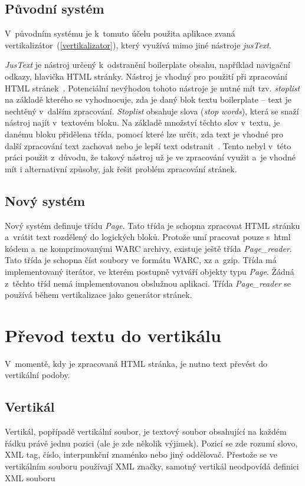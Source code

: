 \section{Původní systém}
V~původním systému je k~tomuto účelu použita aplikace zvaná vertikalizátor~(\ref{vertikalizator}), který využívá
mimo jiné nástroje \textit{jusText}.

\label{jusText}
\textit{JusText} je nástroj určený k~odstranění boilerplate obsahu, například navigační odkazy, hlavička HTML stránky.
Nástroj je vhodný pro použití při zpracování HTML stránek~\cite{JUSTEXT}. Potenciální nevýhodou tohoto nástroje je nutné mít tzv. \textit{stoplist}
na základě kterého se vyhodnocuje, zda je daný blok textu boilerplate -- text je nechtěný v~dalším zpracování. \textit{Stoplist}
obsahuje slova (\textit{stop words}), která se snaží nástroj najít v~textovém bloku. Na základě množství těchto slov v~textu,
je danému bloku přidělena třída, pomocí které lze určit, zda text je vhodné pro další zpracování text zachovat nebo je lepší
text odstranit~\cite{JUSTEXT_ALG}. Tento nebyl v~této práci použit z~důvodu, že takový nástroj už je ve zpracování využit a~je vhodné mít i alternativní způsoby, jak řešit problém zpracování stránek.

\section{Nový systém}
Nový systém definuje třídu \textit{Page}. Tato třída je schopna zpracovat HTML stránku a~vrátit text rozdělený do logických
bloků. Protože umí pracovat pouze s~html kódem a~ne komprimovanými WARC archivy, existuje ještě třída \textit{Page\_reader}.
Tato třída je schopna číst soubory ve formátu WARC, xz a~gzip. Třída má implementovaný iterátor, ve kterém postupně vytváří
objekty typu \textit{Page}.
Žádná z~těchto tříd nemá implementovanou obslužnou aplikaci. Třída \textit{Page\_reader} se používá během vertikalizace
jako generátor stránek.

\chapter{Převod textu do vertikálu} %
\label{vertikalizace}
V~momentě, kdy je zpracovaná HTML stránka, je nutno text převést do vertikální podoby.

\section{Vertikál}
Vertikál, popřípadě vertikální soubor, je textový soubor obsahující na každém řádku právě jednu pozici (ale je zde několik výjimek).
Pozicí se zde rozumí slovo, XML tag, číslo, interpunkční znaménko nebo jiný oddělovač. Přestože se ve vertikálním
souboru používají XML značky, samotný vertikál neodpovídá definici XML souboru~\cite{VERTIKAL}

